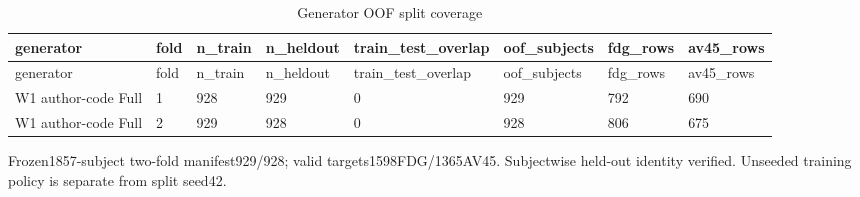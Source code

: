 \begingroup
\footnotesize
\setlength{\tabcolsep}{4pt}
\begin{longtable}{llllllll}
\caption{Generator OOF split coverage}\label{tab:s-n23}\\
\toprule
generator & fold & n\_train & n\_heldout & train\_test\_overlap & oof\_subjects & fdg\_rows & av45\_rows \\
\midrule
\endfirsthead
\toprule
generator & fold & n\_train & n\_heldout & train\_test\_overlap & oof\_subjects & fdg\_rows & av45\_rows \\
\midrule
\endhead
\bottomrule
\endfoot
W1 author-code Full & 1 & 928 & 929 & 0 & 929 & 792 & 690 \\
W1 author-code Full & 2 & 929 & 928 & 0 & 928 & 806 & 675 \\
\end{longtable}
\noindent\parbox{\linewidth}{\footnotesize Frozen1857-subject two-fold manifest929/928; valid targets1598FDG/1365AV45. Subjectwise held-out identity verified. Unseeded training policy is separate from split seed42.}
\endgroup

